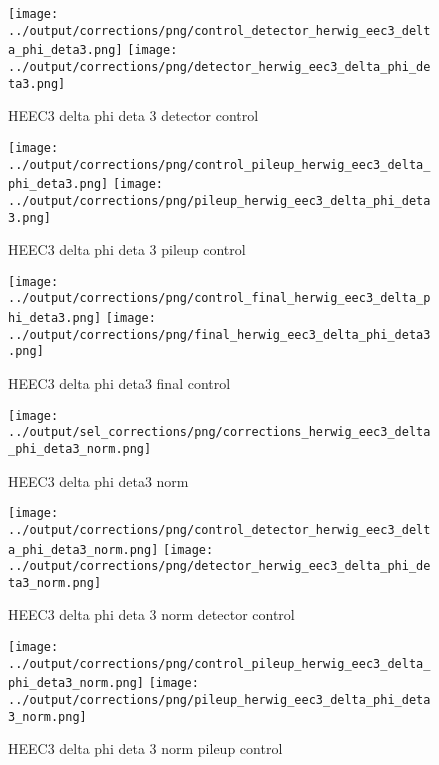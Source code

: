 \documentclass[11pt]{book}
\begin{document}
\begin{figure}[ht]
\centering
\texttt{[image: ../output/corrections/png/control\_detector\_herwig\_eec3\_delta\_phi\_deta3.png]}
\texttt{[image: ../output/corrections/png/detector\_herwig\_eec3\_delta\_phi\_deta3.png]}
\caption{HEEC3 delta phi deta 3 detector control}
\label{fig:HEEC3_delta_phi_deta3_detector_control}
\end{figure}

\begin{figure}[ht]
\centering
\texttt{[image: ../output/corrections/png/control\_pileup\_herwig\_eec3\_delta\_phi\_deta3.png]}
\texttt{[image: ../output/corrections/png/pileup\_herwig\_eec3\_delta\_phi\_deta3.png]}
\caption{HEEC3 delta phi deta 3 pileup control}
\label{fig:HEEC3_delta_phi_deta3_pileup_control}
\end{figure}


\begin{figure}[ht]
\centering
\texttt{[image: ../output/corrections/png/control\_final\_herwig\_eec3\_delta\_phi\_deta3.png]}
\texttt{[image: ../output/corrections/png/final\_herwig\_eec3\_delta\_phi\_deta3.png]}
\caption{HEEC3 delta phi deta3 final control}
\label{fig:HEEC3_delta_phi_deta3_final_control}
\end{figure}

\begin{figure}[ht]
\centering
\texttt{[image: ../output/sel\_corrections/png/corrections\_herwig\_eec3\_delta\_phi\_deta3\_norm.png]}
\caption{HEEC3 delta phi deta3 norm}
\label{fig:HEEC3_delta_phi_deta3_norm}
\end{figure}

\begin{figure}[ht]
\centering
\texttt{[image: ../output/corrections/png/control\_detector\_herwig\_eec3\_delta\_phi\_deta3\_norm.png]}
\texttt{[image: ../output/corrections/png/detector\_herwig\_eec3\_delta\_phi\_deta3\_norm.png]}
\caption{HEEC3 delta phi deta 3 norm detector control}
\label{fig:HEEC3_delta_phi_deta3_norm_detector_control}
\end{figure}

\begin{figure}[ht]
\centering
\texttt{[image: ../output/corrections/png/control\_pileup\_herwig\_eec3\_delta\_phi\_deta3\_norm.png]}
\texttt{[image: ../output/corrections/png/pileup\_herwig\_eec3\_delta\_phi\_deta3\_norm.png]}
\caption{HEEC3 delta phi deta 3 norm pileup control}
\label{fig:HEEC3_delta_phi_deta3_norm_pileup_control}
\end{figure}
\end{document}
